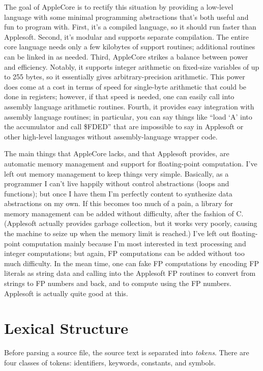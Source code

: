 \documentclass[10pt]{article}
\begin{document}
The goal of AppleCore is to rectify this situation by providing a
low-level language with some minimal programming abstractions that's
both useful and fun to program with.  First, it's a compiled language,
so it should run faster than Applesoft.  Second, it's modular and
supports separate compilation. The entire core language needs only a
few kilobytes of support routines; additional routines can be linked
in as needed.  Third, AppleCore strikes a balance between power and
efficiency.  Notably, it supports integer arithmetic on fixed-size
variables of up to 255 bytes, so it essentially gives
arbitrary-precision arithmetic.  This power does come at a cost in
terms of speed for single-byte arithmetic that could be done in
registers; however, if that speed is needed, one can easily call into
assembly language arithmetic routines.  Fourth, it provides easy
integration with assembly language routines; in particular, you can
say things like ``load `A' into the accumulator and call \$FDED'' that
are impossible to say in Applesoft or other high-level languages
without assembly-language wrapper code.

The main things that AppleCore lacks, and that Applesoft provides, are
automatic memory management and support for floating-point
computation.  I've left out memory management to keep things very
simple.  Basically, as a programmer I can't live happily without
control abstractions (loops and functions); but once I have them I'm
perfectly content to synthesize data abstractions on my own.  If this
becomes too much of a pain, a library for memory management can be
added without difficulty, after the fashion of C.  (Applesoft actually
provides garbage collection, but it works very poorly, causing the
machine to seize up when the memory limit is reached.)  I've left out
floating-point computation mainly because I'm most interested in text
processing and integer computations; but again, FP computations can be
added without too much difficulty.  In the mean time, one can fake FP
computations by encoding FP literals as string data and calling into
the Applesoft FP routines to convert from strings to FP numbers and
back, and to compute using the FP numbers.  Applesoft is actually
quite good at this.

\section{Lexical Structure}

Before parsing a source file, the source text is separated into
\emph{tokens}.  There are four classes of tokens: identifiers,
keywords, constants, and symbols.
\end{document}
